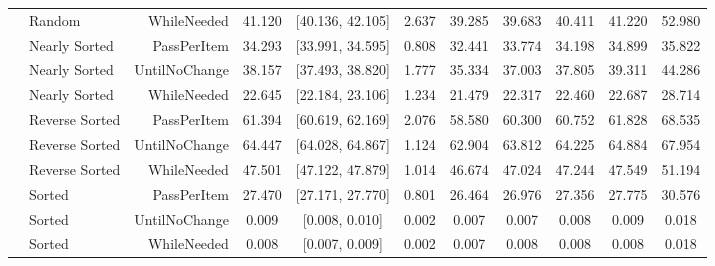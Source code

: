 \begin{table}[t]
\begin{tabular}{llrcccccccc}
 & Random & WhileNeeded & 41.120 & [40.136, 42.105] & 2.637 & 39.285 & 39.683 & 40.411 & 41.220 & 52.980 \\
 & Nearly Sorted & PassPerItem & 34.293 & [33.991, 34.595] & 0.808 & 32.441 & 33.774 & 34.198 & 34.899 & 35.822 \\
 & Nearly Sorted & UntilNoChange & 38.157 & [37.493, 38.820] & 1.777 & 35.334 & 37.003 & 37.805 & 39.311 & 44.286 \\
 & Nearly Sorted & WhileNeeded & 22.645 & [22.184, 23.106] & 1.234 & 21.479 & 22.317 & 22.460 & 22.687 & 28.714 \\
 & Reverse Sorted & PassPerItem & 61.394 & [60.619, 62.169] & 2.076 & 58.580 & 60.300 & 60.752 & 61.828 & 68.535 \\
 & Reverse Sorted & UntilNoChange & 64.447 & [64.028, 64.867] & 1.124 & 62.904 & 63.812 & 64.225 & 64.884 & 67.954 \\
 & Reverse Sorted & WhileNeeded & 47.501 & [47.122, 47.879] & 1.014 & 46.674 & 47.024 & 47.244 & 47.549 & 51.194 \\
 & Sorted & PassPerItem & 27.470 & [27.171, 27.770] & 0.801 & 26.464 & 26.976 & 27.356 & 27.775 & 30.576 \\
 & Sorted & UntilNoChange & 0.009 & [0.008, 0.010] & 0.002 & 0.007 & 0.007 & 0.008 & 0.009 & 0.018 \\
 & Sorted & WhileNeeded & 0.008 & [0.007, 0.009] & 0.002 & 0.007 & 0.008 & 0.008 & 0.008 & 0.018 \\
\bottomrule
\end{tabular}
\end{table}